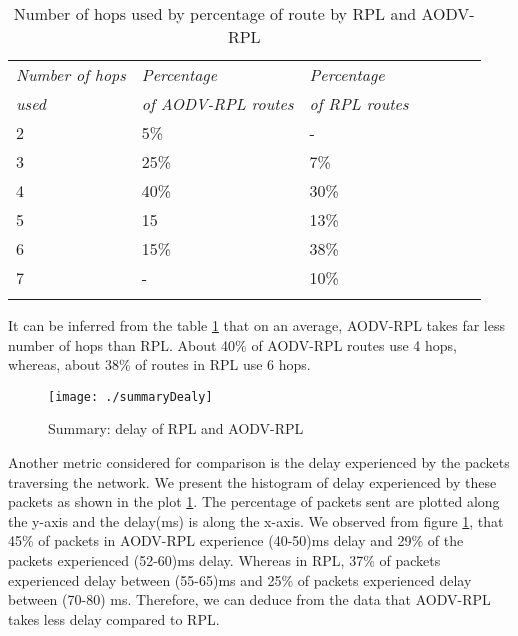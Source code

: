 \documentclass[conference, letterpaper]{IEEEtran}
\begin{document}
\begin{table}[h!]
\centering
\begin{tabular}{lllllll}
\toprule
\emph{Number of hops } & \emph{Percentage }  & \emph{ Percentage }\\
\emph{used} & \emph{of AODV-RPL routes} & \emph{of RPL routes}\\
\midrule 2 &  5\% & -\\ 3 & 25\% & 7\% & \\ 4 & 40\% & 30\% & \\ 5 & 15 & 13\%& \\6 & 15\% & 38\% &\\7 &-&10\%\\
\bottomrule \\
\end{tabular}
\caption{Number of hops used by percentage of route by RPL and AODV-RPL} \label{tab:hops-usage}
\end{table}

It can be inferred from the table \ref{tab:hops-usage} that on an average, AODV-RPL
takes far less number of hops than RPL. About 40\% of AODV-RPL routes use 4 hops,
whereas, about 38\% of routes in RPL use 6 hops.


\begin{figure}[h!] \texttt{[image: ./summaryDealy]}
\caption{Summary: delay of RPL and AODV-RPL} \label{fig:delay} \end{figure}

Another metric considered for comparison is the delay experienced by the
packets traversing the network. We present the histogram of delay experienced
by these packets as shown in the plot \ref{fig:delay}. The percentage of
packets sent are plotted along the y-axis and the delay(ms) is along the
x-axis. We observed from figure \ref{fig:delay}, that 45\% of packets in
AODV-RPL experience (40-50)ms delay and 29\% of the packets experienced
(52-60)ms delay. Whereas in RPL, 37\% of packets experienced delay between
(55-65)ms and 25\% of packets experienced delay between (70-80) ms. Therefore,
we can deduce from the data that AODV-RPL takes less delay compared to RPL.
\end{document}
